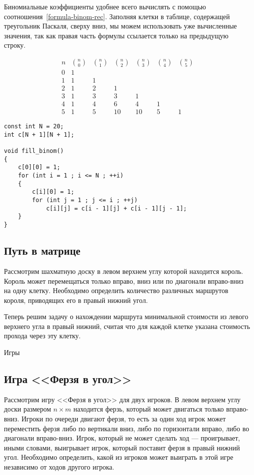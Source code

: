 \documentclass[14pt]{book}
\begin{document}
Биномиальные коэффициенты удобнее всего вычислять с помощью соотношения~\ref{formula-binom-rec}.
Заполняя клетки в таблице, содержащей треугольник Паскаля, сверху вниз, мы можем
использовать уже вычисленные значения, так как правая часть формулы ссылается только на
предыдущую строку.

$$
 \begin{array}{ccccccc}
 n & \binom{n}{0} & \binom{n}{1} & \binom{n}{2} & \binom{n}{3} & \binom{n}{4} & \binom{n}{5} \\
 0 & 1 \\
 1 & 1 & 1 \\
 2 &  1 & 2 & 1 \\
 3 & 1 & 3 & 3 & 1 \\
 4 & 1 & 4 & 6 & 4 & 1 \\
 5 & 1 & 5 & 10 & 10 & 5 & 1
 \end{array}
$$

\begin{lstlisting}
const int N = 20;
int c[N + 1][N + 1];

void fill_binom()
{
    c[0][0] = 1;
    for (int i = 1 ; i <= N ; ++i)
    {
        c[i][0] = 1;
        for (int j = 1 ; j <= i ; ++j)
            c[i][j] = c[i - 1][j] + c[i - 1][j - 1];
    }
}
\end{lstlisting}

\subsection{Путь в матрице}

Рассмотрим шахматную доску в левом верхнем углу которой находится король. Король может перемещаться только вправо, вниз или по диагонали вправо-вниз на одну клетку. Необходимо определить количество различных маршрутов короля, приводящих его в правый нижний угол.

Теперь решим задачу о нахождении маршрута минимальной стоимости из левого верхнего угла в правый нижний, считая что для каждой клетке указана стоимость прохода через эту клетку.

Игры

\subsection{Игра <<Ферзя в угол>>}

Рассмотрим игру <<Ферзя в угол>> для двух игроков. В левом верхнем углу доски размером $n \times m$ 
находится ферзь, который может двигаться только вправо-вниз. Игроки по очереди двигают ферзя, то есть 
за один ход игрок может переместить ферзя либо по вертикали вниз, либо по горизонтали вправо, либо во 
диагонали вправо-вниз. Игрок, который не может сделать ход — проигрывает, иными словами, выигрывает 
игрок, который поставит ферзя в правый нижний угол. Необходимо определить, какой из игроков может 
выиграть в этой игре независимо от ходов другого игрока.
\end{document}
